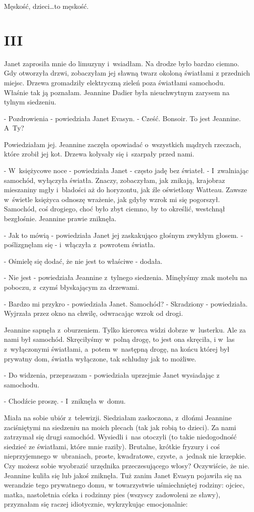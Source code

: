 \documentclass[oneside,polish,12pt,sfheadings]{mwbk}
\begin{document}
Męskość, dzieci\ldots to męskość.

\chapter{III}

Janet zaprosiła mnie do limuzyny i~wsiadłam. Na drodze było bardzo
ciemno. Gdy otworzyła drzwi, zobaczyłam jej sławną twarz okoloną światłami
z przednich miejsc. Drzewa gromadziły elektryczną zieleń poza światłami
samochodu. Właśnie tak ją poznałam. Jeannine Dadier była nieuchwytnym
zarysem na tylnym siedzeniu.

- Pozdrowienia - powiedziała Janet Evasyn. - Cześć. Bonsoir. To jest
Jeannine. A~Ty?

Powiedziałam jej. Jeannine zaczęła opowiadać o~wszystkich mądrych
rzeczach, które zrobił jej kot. Drzewa kołysały się i~szarpały przed
nami.

- W~księżycowe noce - powiedziała Janet - często jadę bez świateł.
- I~zwalniając samochód, wyłączyła światła. Znaczy, zobaczyłam, jak
znikają, krajobraz mieszaniny mgły i~bladości aż do horyzontu, jak
źle oświetlony Watteau. Zawsze w~świetle księżyca odnoszę wrażenie,
jak gdyby wzrok mi się pogorszył. Samochód, coś drogiego, choć było
zbyt ciemno, by to określić, westchnął bezgłośnie. Jeannine prawie
zniknęła.

- Jak to mówią - powiedziała Janet jej zaskakująco głośnym zwykłym
głosem. - poślizgnęłam się - i~włączyła z~powrotem światła. 

- Ośmielę się dodać, że nie jest to właściwe - dodała.

- Nie jest - powiedziała Jeannine z~tylnego siedzenia. Minęłyśmy znak
motelu na poboczu, z~czymś błyskającym za drzewami.

- Bardzo mi przykro - powiedziała Janet. Samochód? - Skradziony -
powiedziała. Wyjrzała przez okno na chwilę, odwracając wzrok od drogi.

Jeannine sapnęła z~oburzeniem. Tylko kierowca widzi dobrze w~lusterku.
Ale za nami był samochód. Skręciłyśmy w~polną drogę, to jest ona skręciła,
i w~las z~wyłączonymi światłami, a~potem w~następną drogę, na końcu
której był prywatny dom, światła wyłączone, tak schludny jak to możliwe.

- Do widzenia, przepraszam - powiedziała uprzejmie Janet wysiadając
z samochodu. 

- Chodźcie proszę. - I~zniknęła w~domu. 

Miała na sobie
ubiór z~telewizji. Siedziałam zaskoczona, z~dłońmi Jeannine zaciśniętymi
na siedzeniu na moich plecach (tak jak robią to dzieci). Za nami zatrzymał
się drugi samochód. Wysiedli i~nas otoczyli (to takie niedogodność
siedzieć ze światłami, które mnie raziły). Brutalne, krótkie fryzury
i coś nieprzyjemnego w~ubraniach, proste, kwadratowe, czyste, a~jednak
nie krzepkie. Czy możesz sobie wyobrazić urzędnika przeczesującego
włosy? Oczywiście, że nie. Jeannine kuliła się lub jakoś zniknęła.
Tuż zanim Janet Evasyn pojawiła się na werandzie tego prywatnego domu,
w towarzystwie uśmiechniętej rodziny: ojciec, matka, nastoletnia córka
i rodzinny pies (wszyscy zadowoleni ze sławy), przyznałam się raczej
idiotycznie, wykrzykując emocjonalnie: 
\end{document}
